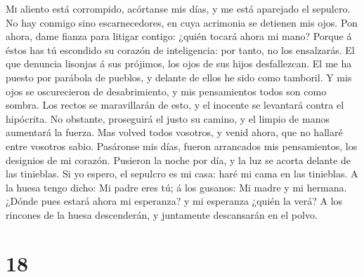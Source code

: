  \textsc{Mi} aliento está corrompido, acórtanse mis días,
y me está aparejado el sepulcro.  No hay conmigo sino
escarnecedores, en cuya acrimonia se detienen mis ojos. 
Pon ahora, dame fianza para litigar contigo: ¿quién tocará ahora mi
mano?  Porque á éstos has tú escondido su corazón de
inteligencia: por tanto, no los ensalzarás.  El que
denuncia lisonjas á sus prójimos, los ojos de sus hijos desfallezcan.
 El me ha puesto por parábola de pueblos, y delante de
ellos he sido como tamboril.  Y mis ojos se oscurecieron
de desabrimiento, y mis pensamientos todos son como sombra.
 Los rectos se maravillarán de esto, y el inocente se
levantará contra el hipócrita.  No obstante, proseguirá el
justo su camino, y el limpio de manos aumentará la fuerza.
 Mas volved todos vosotros, y venid ahora, que no hallaré
entre vosotros sabio.  Pasáronse mis días, fueron
arrancados mis pensamientos, los designios de mi corazón.
 Pusieron la noche por día, y la luz se acorta delante de
las tinieblas.  Si yo espero, el sepulcro es mi casa:
haré mi cama en las tinieblas.  A la huesa tengo dicho:
Mi padre eres tú; á los gusanos: Mi madre y mi hermana. 
¿Dónde pues estará ahora mi esperanza? y mi esperanza ¿quién la verá?
 A los rincones de la huesa descenderán, y juntamente
descansarán en el polvo.

\hypertarget{section-17}{%
\section{18}\label{section-17}}

